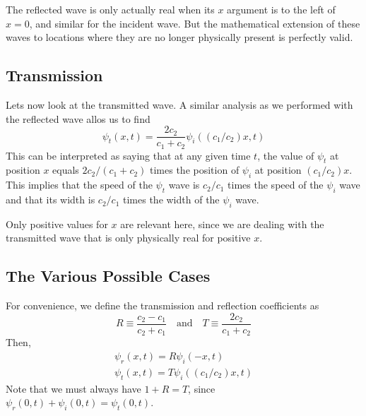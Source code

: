 The reflected wave is only actually real when its $x$ argument is to the left of $x=0$, and similar for the incident wave. But the mathematical extension of these waves to locations where they are no longer physically present is perfectly valid.
\subsection*{Transmission}
Lets now look at the transmitted wave. A similar analysis as we performed with the reflected wave allos us to find
\[ \psi_t(x,t) = \frac{2c_2}{c_1+c_2} \psi_i ((c_1/c_2)x, t)\]
This can be interpreted as saying that at any given time $t$, the value of $\psi_t$ at position $x$ equals $2c_2/(c_1+c_2)$ times the position of $\psi_i$ at position $(c_1/c_2)x$. This implies that the speed of the $\psi_t$ wave is $c_2/c_1$ times the speed of the $\psi_i$ wave and that its width is $c_2/c_1$ times the width of the $\psi_i$ wave. 

Only positive values for $x$ are relevant here, since we are dealing with the transmitted wave that is only physically real for positive $x$.
\subsection*{The Various Possible Cases}
For convenience, we define the transmission and reflection coefficients as
\[ R \equiv \frac{c_2-c_1}{c_2+c_1} \quad\text{and}\quad T\equiv \frac{2c_2}{c_1+c_2} \]
Then,
\begin{align*}
    \psi_r(x,t) = R\psi_i(-x, t) \\
    \psi_t(x,t) = T\psi_i((c_1/c_2)x, t)
\end{align*}
Note that we must always have $1+R  =T$, since $\psi_r(0, t) + \psi_i(0, t) = \psi_t(0, t)$.    

